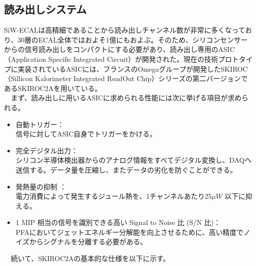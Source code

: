 \subsection{読み出しシステム}
 SiW-ECALは高精細であることから読み出しチャンネル数が非常に多くなっており、30層のECAL全体ではおよそ1億にもおよぶ。そのため、シリコンセンサーからの信号読み出しをコンパクトにする必要があり、読み出し専用のASIC（Application Specific Integrated Circuit）が開発された。現在の技術プロトタイプに実装されているASICには、フランスのOmegaグループが開発したSKIROC（Sillicon Kalorimeter Integrated ReadOut Chip）シリーズの第二バージョンであるSKIROC2Aを用いている。\\
　まず、読み出しに用いるASICに求められる性能には次に挙げる項目が求められる。
 \begin{itemize}
	\item 自動トリガー：\\
		信号に対してASIC自身でトリガーをかける。
	\item 完全デジタル出力：\\
		 シリコン半導体検出器からのアナログ情報をすべてデジタル変換し、DAQへ送信する。データ量を圧縮し、またデータの劣化を防ぐことができる。
	\item 発熱量の抑制 ：\\
		電力消費によって発生するジュール熱を、1チャンネルあたり25$\mu W$ 以下に抑える。
	\item 1 MIP 相当の信号を識別できる高い Signal to Noise 比 (S/N 比)：\\
		PFAにおいてジェットエネルギー分解能を向上させるために、高い精度でノイズからシグナルを分離する必要がある。
 \end{itemize}
　続いて、SKIROC2Aの基本的な仕様を以下に示す。
